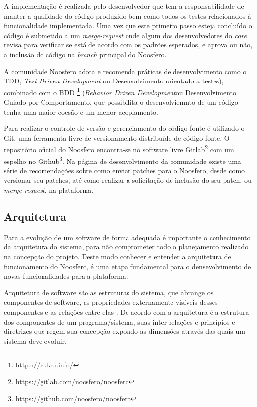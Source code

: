 A implementação é realizada pelo desenvolvedor que tem a responsabilidade de manter a qualidade do código produzido bem como todos os testes relacionados à funcionalidade implementada. Uma vez que este primeiro passo esteja concluído o código é submetido a um \textit{merge-request} onde algum dos desenvolvedores do \textit{core} revisa para verificar se está de acordo com os padrões esperados, e aprova ou não, a inclusão do código na \textit{branch} principal do Noosfero.

A comunidade Noosfero adota e recomenda práticas de desenvolvimento como o TDD, \textit{Test Driven Development} ou Desenvolvimento orientado a testes), combinado com o BDD \footnote{\url{https://cukes.info/}} (\textit{Behavior Driven Development}ou Desenvolvimento Guiado por Comportamento, que possibilita o desenvolviemnto de um código tenha uma maior coesão e um menor acoplamento.

Para realizar o controle de versão e gerenciamento do código fonte é utilizado o Git, uma ferramenta livre de versionamento distribuído de código fonte. O repositório oficial do Noosfero encontra-se no software livre Gitlab\footnote{\url{https://gitlab.com/noosfero/noosfero}} com um espelho no Github\footnote{\url{https://github.com/noosfero/noosfero}}. Na página de desenvolvimento da comunidade existe uma série de recomendações sobre como enviar patches para o Noosfero, desde como versionar seu patches, até como realizar a solicitação de inclusão do seu patch, ou \textit{merge-request}, na plataforma.

\subsection{Arquitetura}
\label{arquitetura}
Para a evolução de um software de forma adequada é importante o conhecimento da arquitetura do sistema, para não comprometer todo o planejamento realizado na concepção do projeto. Deste modo conhecer e entender a arquitetura de funcionamento do Noosfero, é uma etapa fundamental para o densevolvimento de novas funcionalidades para a plataforma.

Arquitetura de software são as estruturas do sistema, que abrange os componentes de software, as propriedades externamente visíveis desses componentes e as relações entre elas \cite{pressman2011engenharia}. De acordo com  a arquitetura é a estrutura dos componentes de um programa/sistema, suas inter-relações e princípios e diretrizes que regem sua concepção expondo as dimensões através das quais um sistema deve evoluir.

